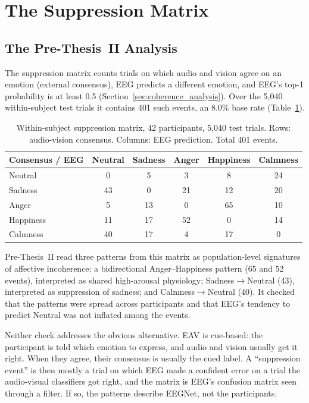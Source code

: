 \section{The Suppression Matrix}
\label{sec:audit_suppression}

\subsection{The Pre-Thesis~II Analysis}

The suppression matrix counts trials on which audio and vision agree on an emotion
(external consensus), EEG predicts a different emotion, and EEG's top-1 probability is
at least 0.5 (Section~\ref{sec:coherence_analysis}). Over the 5{,}040 within-subject test
trials it contains 401 such events, an 8.0\% base rate (Table~\ref{tab:suppression_matrix}).

\begin{table}[htbp]
\centering
\small
\caption{Within-subject suppression matrix, 42 participants, 5{,}040 test trials. Rows:
audio-vision consensus. Columns: EEG prediction. Total 401 events.}
\label{tab:suppression_matrix}
\begin{tabular}{l c c c c c}
\hline
\textbf{Consensus / EEG} & \textbf{Neutral} & \textbf{Sadness} & \textbf{Anger} & \textbf{Happiness} & \textbf{Calmness} \\
\hline
Neutral   & 0  & 5  & 3  & 8  & 24 \\
Sadness   & 43 & 0  & 21 & 12 & 20 \\
Anger     & 5  & 13 & 0  & 65 & 10 \\
Happiness & 11 & 17 & 52 & 0  & 14 \\
Calmness  & 40 & 17 & 4  & 17 & 0 \\
\hline
\end{tabular}
\end{table}

Pre-Thesis~II read three patterns from this matrix as population-level signatures of
affective incoherence: a bidirectional Anger--Happiness pattern (65 and 52 events),
interpreted as shared high-arousal physiology; Sadness$\rightarrow$Neutral (43),
interpreted as suppression of sadness; and Calmness$\rightarrow$Neutral (40). It
checked that the patterns were spread across participants and that EEG's tendency to
predict Neutral was not inflated among the events.

Neither check addresses the obvious alternative. EAV is cue-based: the participant is
told which emotion to express, and audio and vision usually get it right. When they
agree, their consensus is usually the cued label. A ``suppression event'' is then
mostly a trial on which EEG made a confident error on a trial the audio-visual
classifiers got right, and the matrix is EEG's confusion matrix seen through a filter.
If so, the patterns describe EEGNet, not the participants.

